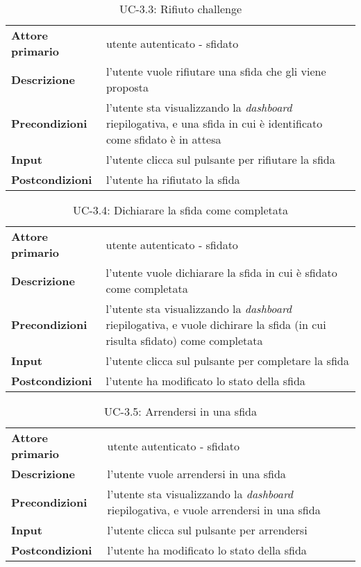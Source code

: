 \begin{table}[H]
    \centering
    \begin{tabular}{|p{3cm}p{11.15cm}|}
        \hline
        \textbf{Attore primario} & utente autenticato - sfidato \\
        \textbf{Descrizione} & l’utente vuole rifiutare una sfida che gli viene proposta \\
        \textbf{Precondizioni} & l’utente sta visualizzando la \textit{dashboard} riepilogativa, e una sfida in cui è identificato come sfidato è in attesa \\
        \textbf{Input} & l’utente clicca sul pulsante per rifiutare la sfida \\
        \textbf{Postcondizioni} & l’utente ha rifiutato la sfida \\\hline
    \end{tabular}
    \caption{UC-3.3: Rifiuto challenge}
\end{table}
\begin{table}[H]
    \centering
    \begin{tabular}{|p{3cm}p{11.15cm}|}
        \hline
        \textbf{Attore primario} & utente autenticato - sfidato \\
        \textbf{Descrizione} & l’utente vuole dichiarare la sfida in cui è sfidato come completata \\
        \textbf{Precondizioni} & l’utente sta visualizzando la \textit{dashboard} riepilogativa, e vuole dichirare la sfida (in cui risulta sfidato) come completata \\
        \textbf{Input} & l’utente clicca sul pulsante per completare la sfida \\
        \textbf{Postcondizioni} & l’utente ha modificato lo stato della sfida \\\hline
    \end{tabular}
    \caption{UC-3.4: Dichiarare la sfida come completata}
\end{table}
\begin{table}[H]
    \centering
    \begin{tabular}{|p{3cm}p{11.15cm}|}
        \hline
        \textbf{Attore primario} & utente autenticato - sfidato \\
        \textbf{Descrizione} & l’utente vuole arrendersi in una sfida \\
        \textbf{Precondizioni} & l’utente sta visualizzando la \textit{dashboard} riepilogativa, e vuole arrendersi in una sfida \\
        \textbf{Input} & l’utente clicca sul pulsante per arrendersi \\
        \textbf{Postcondizioni} & l’utente ha modificato lo stato della sfida \\\hline
    \end{tabular}
    \caption{UC-3.5: Arrendersi in una sfida}
\end{table}
